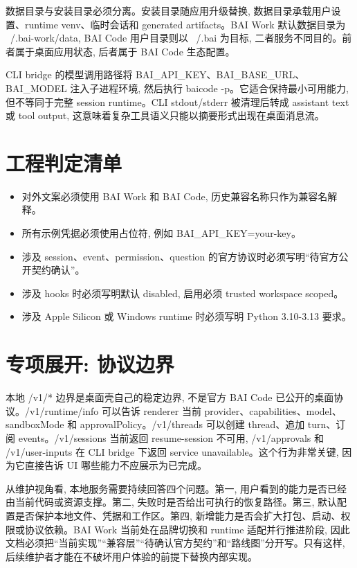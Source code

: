 数据目录与安装目录必须分离。安装目录随应用升级替换, 数据目录承载用户设置、runtime venv、临时会话和 generated artifacts。BAI Work 默认数据目录为 ~/.bai-work/data, BAI Code 用户目录则以 ~/.bai 为目标, 二者服务不同目的。前者属于桌面应用状态, 后者属于 BAI Code 生态配置。

CLI bridge 的模型调用路径将 BAI\_API\_KEY、BAI\_BASE\_URL、BAI\_MODEL 注入子进程环境, 然后执行 baicode -p。它适合保持最小可用能力, 但不等同于完整 session runtime。CLI stdout/stderr 被清理后转成 assistant text 或 tool output, 这意味着复杂工具语义只能以摘要形式出现在桌面消息流。

\section{工程判定清单}
\begin{itemize}
  \item 对外文案必须使用 BAI Work 和 BAI Code, 历史兼容名称只作为兼容名解释。
  \item 所有示例凭据必须使用占位符, 例如 BAI\_API\_KEY=your-key。
  \item 涉及 session、event、permission、question 的官方协议时必须写明“待官方公开契约确认”。
  \item 涉及 hooks 时必须写明默认 disabled, 启用必须 trusted workspace scoped。
  \item 涉及 Apple Silicon 或 Windows runtime 时必须写明 Python 3.10-3.13 要求。
\end{itemize}

\section{专项展开: 协议边界}
本地 /v1/* 边界是桌面壳自己的稳定边界, 不是官方 BAI Code 已公开的桌面协议。/v1/runtime/info 可以告诉 renderer 当前 provider、capabilities、model、sandboxMode 和 approvalPolicy。/v1/threads 可以创建 thread、追加 turn、订阅 events。/v1/sessions 当前返回 resume-session 不可用, /v1/approvals 和 /v1/user-inputs 在 CLI bridge 下返回 service unavailable。这个行为非常关键, 因为它直接告诉 UI 哪些能力不应展示为已完成。

从维护视角看, 本地服务需要持续回答四个问题。第一, 用户看到的能力是否已经由当前代码或资源支撑。第二, 失败时是否给出可执行的恢复路径。第三, 默认配置是否保护本地文件、凭据和工作区。第四, 新增能力是否会扩大打包、启动、权限或协议依赖。BAI Work 当前处在品牌切换和 runtime 适配并行推进阶段, 因此文档必须把“当前实现”“兼容层”“待确认官方契约”和“路线图”分开写。只有这样, 后续维护者才能在不破坏用户体验的前提下替换内部实现。

